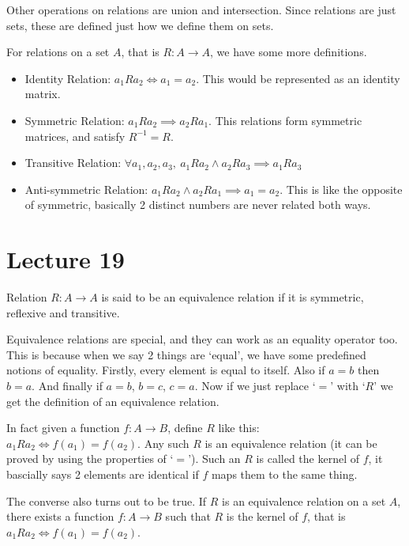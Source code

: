 \documentclass[a4paper,10pt]{article}
\theoremstyle{definition} %
\begin{document}
    Other operations on relations are union and intersection. Since relations are just sets, these are
    defined just how we define them on sets.
    
    For relations on a set $A$, that is $R:A \rightarrow A$, we have some more definitions.
    \begin{itemize}
        \item Identity Relation: $a_1Ra_2 \iff a_1 = a_2$. This would be represented as an identity matrix.
        \item Symmetric Relation: $a_1Ra_2 \implies a_2Ra_1$. This relations form symmetric matrices, and satisfy $R^{-1} = R$.
        \item Transitive Relation: $\forall a_1,a_2,a_3, \ a_1Ra_2 \land a_2Ra_3 \implies a_1Ra_3$
        \item Anti-symmetric Relation: $a_1Ra_2 \land a_2Ra_1 \implies a_1 = a_2$. This is like the opposite of symmetric, 
        basically 2 distinct numbers are never related both ways.
    \end{itemize}

    \section{Lecture 19}

    Relation $R: A \rightarrow A$ is said to be an equivalence relation if it is symmetric, reflexive
    and transitive. 

    Equivalence relations are special, and they can work as an equality operator too. This is because
    when we say 2 things are `equal', we have some predefined notions of equality. Firstly,
    every element is equal to itself. Also if $a = b$ then $b = a$. And finally if $a = b$,
    $b = c$, $c = a$. Now if we just replace `$=$' with `$R$' we get the definition of an equivalence 
    relation.
    
    In fact given a function $f: A \rightarrow B$, define $R$ like this: \\
    $a_1Ra_2 \iff f(a_1) = f(a_2)$. Any such $R$ is an equivalence relation (it can be proved
    by using the properties of `$=$'). Such an $R$ is called the kernel of $f$, it bascially 
    says 2 elements are identical if $f$ maps them to the same thing.

    The converse also turns out to be true. If $R$ is an equivalence relation on a set $A$, 
    there exists a function $f: A \rightarrow B$ such that $R$ is the kernel of $f$, that is 
    $a_1Ra_2 \iff f(a_1) = f(a_2)$.
\end{document}
